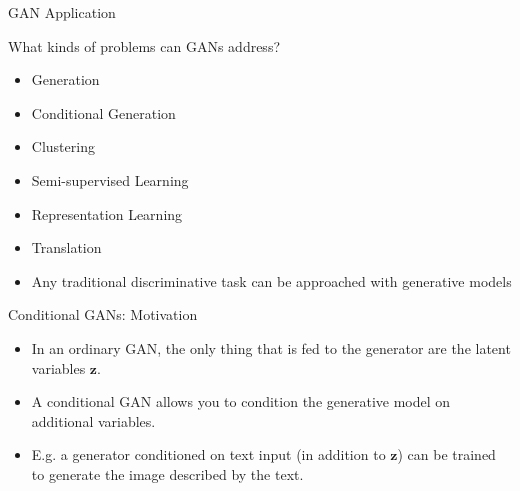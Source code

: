  \begin{frame} {GAN Application}
 
 What kinds of problems can GANs address?
  \begin{itemize}
    \item Generation
    \item Conditional Generation
    \item Clustering
    \item Semi-supervised Learning
    \item Representation Learning
    \item Translation
    \item Any traditional discriminative task can be approached with
generative models
  \end{itemize}

\end{frame}



\begin{frame} {Conditional GANs: Motivation}
  \begin{itemize}
    \item In an ordinary GAN, the only thing that is fed to the generator are the latent variables $\mathbf{z}$.
    \item A conditional GAN allows you to condition the generative model on additional variables. %
    \item E.g. a generator conditioned on text input (in addition to $\mathbf{z}$) can be trained to generate the image described by the text.
  \end{itemize}
\end{frame}


